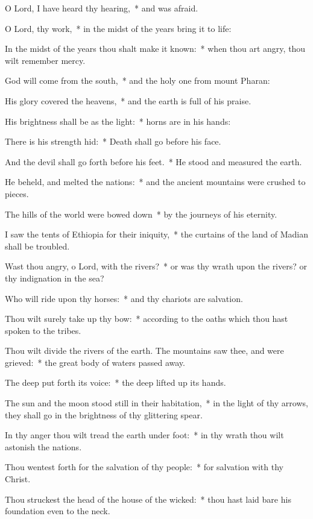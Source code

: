 \begin{enpars}
\item O Lord, I have heard thy hearing,~* and was afraid.
\item O Lord, thy work,~* in the midst of the years bring it to life:
\item In the midst of the years thou shalt make it known:~* when thou art angry, thou wilt remember mercy.
\item God will come from the south,~* and the holy one from mount Pharan:
\item His glory covered the heavens,~* and the earth is full of his praise.
\item His brightness shall be as the light:~* horns are in his hands:
\item There is his strength hid:~* Death shall go before his face.
\item And the devil shall go forth before his feet.~* He stood and measured the earth.
\item He beheld, and melted the nations:~* and the ancient mountains were crushed to pieces.
\item The hills of the world were bowed down~* by the journeys of his eternity.
\item I saw the tents of Ethiopia for their iniquity,~* the curtains of the land of Madian shall be troubled.
\item Wast thou angry, o Lord, with the rivers?~* or was thy wrath upon the rivers? or thy indignation in the sea?
\item Who will ride upon thy horses:~* and thy chariots are salvation.
\item Thou wilt surely take up thy bow:~* according to the oaths which thou hast spoken to the tribes.
\item Thou wilt divide the rivers of the earth. The mountains saw thee, and were grieved:~* the great body of waters passed away.
\item The deep put forth its voice:~* the deep lifted up its hands.
\item The sun and the moon stood still in their habitation,~* in the light of thy arrows, they shall go in the brightness of thy glittering spear.
\item In thy anger thou wilt tread the earth under foot:~* in thy wrath thou wilt astonish the nations.
\item Thou wentest forth for the salvation of thy people:~* for salvation with thy Christ.
\item Thou struckest the head of the house of the wicked:~* thou hast laid bare his foundation even to the neck.

\end{enpars}
